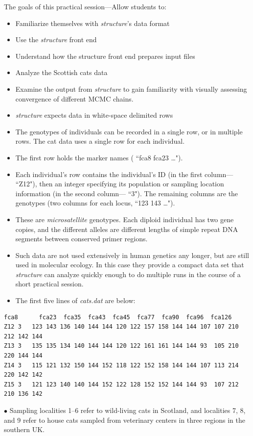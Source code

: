 
 
\newcommand{\bY}{{\bm{Y}}}
\newcommand{\bX}{{\bm{X}}}

 
The goals of this practical session---Allow students to:
\begin{itemize}
\item Familiarize themselves with {\em structure}'s data format
\item Use the {\em structure} front end
\item Understand how the structure front end prepares input files 
\item Analyze the Scottish cats data
\item Examine the output from {\em structure} to gain familiarity with visually assessing
convergence of different MCMC chains.
\end{itemize}

\begin{itemize}
\item {\em structure} expects data in white-space delimited rows
\item The genotypes of individuals can be recorded in a single row, or
in multiple rows.  The cat data uses a single row for each individual.
\item The first row holds the marker names (\eg{} ``fca8 fca23 \ldots").
\item Each individual's row contains the individual's ID (in the first column---\eg{} ``Z12"), then an integer specifying its population or sampling location information (in the second column---\eg{} ``3").  The remaining columns are the genotypes (two columns for each locus, \eg{} ``123 143 \ldots").
\item These are {\em microsatellite} genotypes.  Each diploid individual has two gene copies, and the different alleles are different lengths of simple repeat DNA segments between conserved primer regions.  
\item Such data are not used extensively in human genetics any longer, but are still used in molecular ecology.  In this case they provide a compact data set that {\em structure} can analyze quickly enough to do multiple runs in the course of a short practical session.
\item The first five lines of {\sl cats.dat} are below:
\end{itemize} 
{\footnotesize
\begin{verbatim}
fca8      fca23  fca35  fca43  fca45  fca77  fca90  fca96  fca126
Z12 3   123 143 136 140 144 144 120 122 157 158 144 144 107 107 210 212 142 144
Z13 3   135 135 134 140 144 144 120 122 161 161 144 144 93  105 210 220 144 144
Z14 3   115 121 132 150 144 152 118 122 152 158 144 144 107 113 214 220 142 142
Z15 3   121 123 140 140 144 152 122 128 152 152 144 144 93  107 212 210 136 142
\end{verbatim}
}
$\bullet$ Sampling localities 1--6 refer to wild-living cats in Scotland, and localities 7, 8, and 9 refer to house cats sampled from veterinary centers in three regions in the southern UK.



